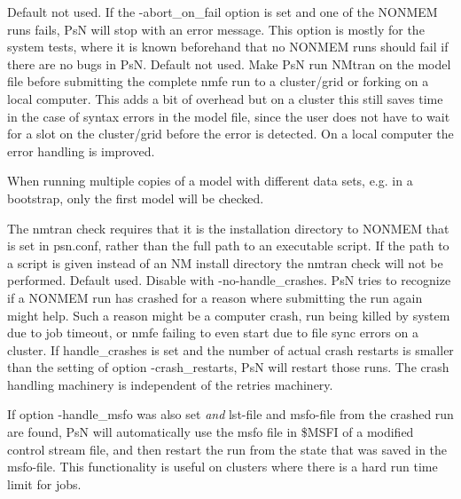 \begin{optionlist}
Default not used. If the -abort\_on\_fail option is set and one of the NONMEM runs
fails, PsN will stop with an error message. This option
is mostly for the system tests, where it is known beforehand that no
NONMEM runs should fail if there are no bugs in PsN.
\nextopt
{}
Default not used. 
Make PsN run NMtran on the model file before submitting the complete nmfe run to a cluster/grid or forking on a local computer. This adds a bit of overhead but on a cluster this still saves time in the case of syntax errors in the model file, since the user does not have to wait for a slot on the cluster/grid before the error is detected. On a local computer the error handling is improved.

When running multiple copies of a model with different data sets, e.g. in a bootstrap, only the first model will be checked. 

The nmtran check requires that it is the installation directory to NONMEM that is set in psn.conf, rather than the full path to an executable script. If the path to a script is given instead of an NM install directory the nmtran check will not be performed.
\nextopt
{}
Default used. Disable with -no-handle\_crashes. PsN tries to recognize if a NONMEM run has crashed for
a reason where submitting the run again might help. Such a reason might be
a computer crash, run being killed by system due to job timeout, or nmfe failing to even start due to file sync errors on a cluster.
If handle\_crashes is set and the number of actual crash restarts is smaller than the setting of option
-crash\_restarts, PsN will restart those runs. The crash handling machinery is independent of the retries machinery.

If option -handle\_msfo was also set \emph{and} lst-file and msfo-file from the crashed run are found, PsN will automatically use the
msfo file in \$MSFI of a modified control stream file, and then restart the run from the state that was saved in the msfo-file.
This functionality is useful on clusters where there is a hard run time limit for jobs.


\end{optionlist}
